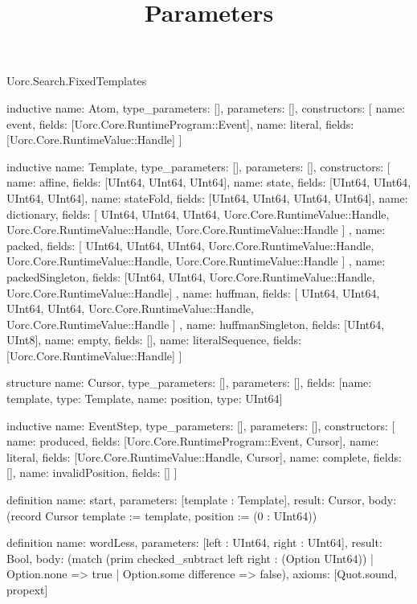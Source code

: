 \begin{lexlean}{Uorc.Search.FixedTemplates}
\title{Parameters}
\begin{semanticmodule}
inductive{
  name: Atom,
  type_parameters: [],
  parameters: [],
  constructors: [
    {name: event, fields: [Uorc.Core.RuntimeProgram::Event]},
    {name: literal, fields: [Uorc.Core.RuntimeValue::Handle]}
  ]
}

inductive{
  name: Template,
  type_parameters: [],
  parameters: [],
  constructors: [
    {name: affine, fields: [UInt64, UInt64, UInt64]},
    {name: state, fields: [UInt64, UInt64, UInt64, UInt64]},
    {name: stateFold, fields: [UInt64, UInt64, UInt64, UInt64]},
    {
      name: dictionary,
      fields: [
        UInt64,
        UInt64,
        UInt64,
        Uorc.Core.RuntimeValue::Handle,
        Uorc.Core.RuntimeValue::Handle,
        Uorc.Core.RuntimeValue::Handle
      ]
    },
    {
      name: packed,
      fields: [
        UInt64,
        UInt64,
        UInt64,
        Uorc.Core.RuntimeValue::Handle,
        Uorc.Core.RuntimeValue::Handle,
        Uorc.Core.RuntimeValue::Handle
      ]
    },
    {
      name: packedSingleton,
      fields: [UInt64, UInt64, Uorc.Core.RuntimeValue::Handle, Uorc.Core.RuntimeValue::Handle]
    },
    {
      name: huffman,
      fields: [
        UInt64,
        UInt64,
        UInt64,
        UInt64,
        Uorc.Core.RuntimeValue::Handle,
        Uorc.Core.RuntimeValue::Handle
      ]
    },
    {name: huffmanSingleton, fields: [UInt64, UInt8]},
    {name: empty, fields: []},
    {name: literalSequence, fields: [Uorc.Core.RuntimeValue::Handle]}
  ]
}

structure{
  name: Cursor,
  type_parameters: [],
  parameters: [],
  fields: [{name: template, type: Template}, {name: position, type: UInt64}]
}

inductive{
  name: EventStep,
  type_parameters: [],
  parameters: [],
  constructors: [
    {name: produced, fields: [Uorc.Core.RuntimeProgram::Event, Cursor]},
    {name: literal, fields: [Uorc.Core.RuntimeValue::Handle, Cursor]},
    {name: complete, fields: []},
    {name: invalidPosition, fields: []}
  ]
}

definition{
  name: start,
  parameters: [template : Template],
  result: Cursor,
  body: (record Cursor {template := template, position := (0 : UInt64)})
}

definition{
  name: wordLess,
  parameters: [left : UInt64, right : UInt64],
  result: Bool,
  body: (match (prim checked_subtract left right : (Option UInt64))
    | Option.none => true
    | Option.some difference => false),
  axioms: [Quot.sound, propext]
}


\end{semanticmodule}
\end{lexlean}
